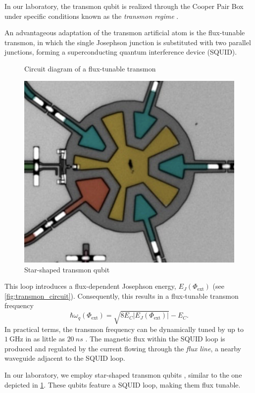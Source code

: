 In our laboratory, the transmon qubit is realized through the Cooper Pair Box under specific conditions known as the \emph{transmon regime} \cite{transmon_regime}.

An advantageous adaptation of the transmon artificial atom is the flux-tunable transmon, in which the single Josephson junction is substituted with two parallel junctions, forming a superconducting quantum interference device (SQUID).
\begin{figure}[b]
    \begin{minipage}[b]{0.5\linewidth}
      \centering
      
      \captionsetup{skip=-20pt}
      \caption{Circuit diagram of a flux-tunable transmon}
      \label{fig:transmon_circuit}
    \end{minipage}
    \hfill
    \begin{minipage}[b]{0.45\linewidth}
      \centering
      \includegraphics[width = 0.5 \textwidth]{Images/Chap1/star_transmon.png}
      \caption{Star-shaped transmon qubit}
      \label{fig:star_transmon}
    \end{minipage}
  \end{figure}

This loop introduces a flux-dependent Josephson energy, $E_J(\Phi_\text{ext})$ (see \cref{fig:transmon_circuit}).
Consequently, this results in a flux-tunable transmon frequency 
\begin{equation}
    \hbar \omega_q(\Phi_\text{ext}) = \sqrt{8 E_C|E_J(\Phi_\text{ext})|} - E_C.
\end{equation}
In practical terms, the transmon frequency can be dynamically tuned by up to $\SI{1}{\giga\hertz}$ in as little as $\SI{20}{ns}$ \cite{di_carlo}.
The magnetic flux within the SQUID loop is produced and regulated by the current flowing through the \emph{flux line}, a nearby waveguide adjacent to the SQUID loop.

In our laboratory, we employ star-shaped transmon qubits \cite{transmon_qubits}, similar to the one depicted in \cref{fig:star_transmon}.
These qubits feature a SQUID loop, making them flux tunable.



